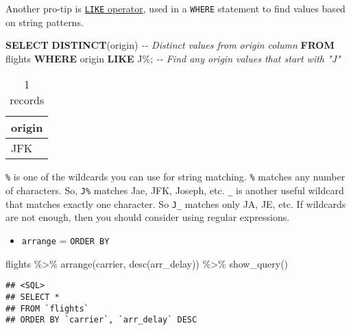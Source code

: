 \documentclass[
]{book}
\newenvironment{Shaded}{\begin{snugshade}}{\end{snugshade}}
\newcommand{\CommentTok}[1]{\textcolor[rgb]{0.56,0.35,0.01}{\textit{#1}}}
\newcommand{\FunctionTok}[1]{\textcolor[rgb]{0.00,0.00,0.00}{#1}}
\newcommand{\KeywordTok}[1]{\textcolor[rgb]{0.13,0.29,0.53}{\textbf{#1}}}
\newcommand{\NormalTok}[1]{#1}
\newcommand{\SpecialCharTok}[1]{\textcolor[rgb]{0.00,0.00,0.00}{#1}}
\newcommand{\StringTok}[1]{\textcolor[rgb]{0.31,0.60,0.02}{#1}}
\providecommand{\tightlist}{%
  \setlength{\itemsep}{0pt}\setlength{\parskip}{0pt}}
\begin{document}
Another pro-tip is \href{https://www.w3schools.com/sql/sql_like.asp}{\texttt{LIKE} operator}, used in a \texttt{WHERE} statement to find values based on string patterns.

\begin{Shaded}
\begin{Highlighting}[]
\KeywordTok{SELECT} \KeywordTok{DISTINCT}\NormalTok{(origin) }\CommentTok{{-}{-} Distinct values from origin column}
\KeywordTok{FROM}\NormalTok{ flights}
\KeywordTok{WHERE}\NormalTok{ origin }\KeywordTok{LIKE} \StringTok{\textquotesingle{}J\%\textquotesingle{}}\NormalTok{; }\CommentTok{{-}{-} Find any origin values that start with "J"}
\end{Highlighting}
\end{Shaded}

\begin{table}

\caption{\label{tab:unnamed-chunk-16}1 records}
\centering
\begin{tabular}[t]{l}
\hline
origin\\
\hline
JFK\\
\hline
\end{tabular}
\end{table}

\texttt{\%} is one of the wildcards you can use for string matching. \texttt{\%} matches any number of characters. So, \texttt{J\%} matches Jae, JFK, Joseph, etc. \texttt{\_} is another useful wildcard that matches exactly one character. So \texttt{J\_} matches only JA, JE, etc. If wildcards are not enough, then you should consider using regular expressions.

\begin{itemize}
\tightlist
\item
  \texttt{arrange} = \texttt{ORDER\ BY}
\end{itemize}

\begin{Shaded}
\begin{Highlighting}[]
\NormalTok{flights }\SpecialCharTok{\%\textgreater{}\%} 
  \FunctionTok{arrange}\NormalTok{(carrier, }\FunctionTok{desc}\NormalTok{(arr\_delay)) }\SpecialCharTok{\%\textgreater{}\%}
  \FunctionTok{show\_query}\NormalTok{()}
\end{Highlighting}
\end{Shaded}

\begin{verbatim}
## <SQL>
## SELECT *
## FROM `flights`
## ORDER BY `carrier`, `arr_delay` DESC
\end{verbatim}
\end{document}
